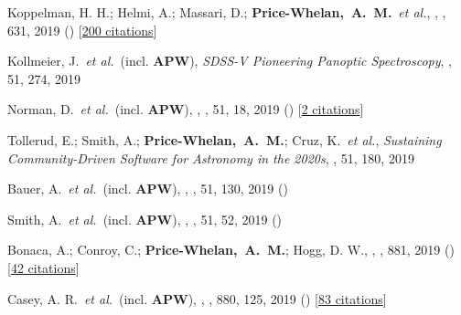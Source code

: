 {\item[{\color{deemph}\scriptsize64}]Koppelman, H. H.; Helmi, A.; Massari, D.; \textbf{Price-Whelan,~A.~M.}~\textit{et al.}, , \aanda, 631, 2019 () [\href{http://adsabs.harvard.edu/abs/2019A&A...631L...9K}{200 citations}]

\item[{\color{deemph}\scriptsize63}]Kollmeier, J.~\textit{et al.}~(incl. \textbf{APW}), \textit{SDSS-V Pioneering Panoptic Spectroscopy}, \baas, 51, 274, 2019

\item[{\color{deemph}\scriptsize62}]Norman, D.~\textit{et al.}~(incl. \textbf{APW}), , \baas, 51, 18, 2019 () [\href{http://adsabs.harvard.edu/abs/2019BAAS...51g..18N}{2 citations}]

\item[{\color{deemph}\scriptsize61}]Tollerud, E.; Smith, A.; \textbf{Price-Whelan,~A.~M.}; Cruz, K.~\textit{et al.}, \textit{Sustaining Community-Driven Software for Astronomy in the 2020s}, \baas, 51, 180, 2019

\item[{\color{deemph}\scriptsize60}]Bauer, A.~\textit{et al.}~(incl. \textbf{APW}), , \baas, 51, 130, 2019 ()

\item[{\color{deemph}\scriptsize59}]Smith, A.~\textit{et al.}~(incl. \textbf{APW}), , \baas, 51, 52, 2019 ()

\item[{\color{deemph}\scriptsize58}]Bonaca, A.; Conroy, C.; \textbf{Price-Whelan,~A.~M.}; Hogg, D. W., , \apj, 881, 2019 () [\href{http://adsabs.harvard.edu/abs/2019ApJ...881L..37B}{42 citations}]

\item[{\color{deemph}\scriptsize57}]Casey, A. R.~\textit{et al.}~(incl. \textbf{APW}), , \apj, 880, 125, 2019 () [\href{http://adsabs.harvard.edu/abs/2019ApJ...880..125C}{83 citations}]

}
